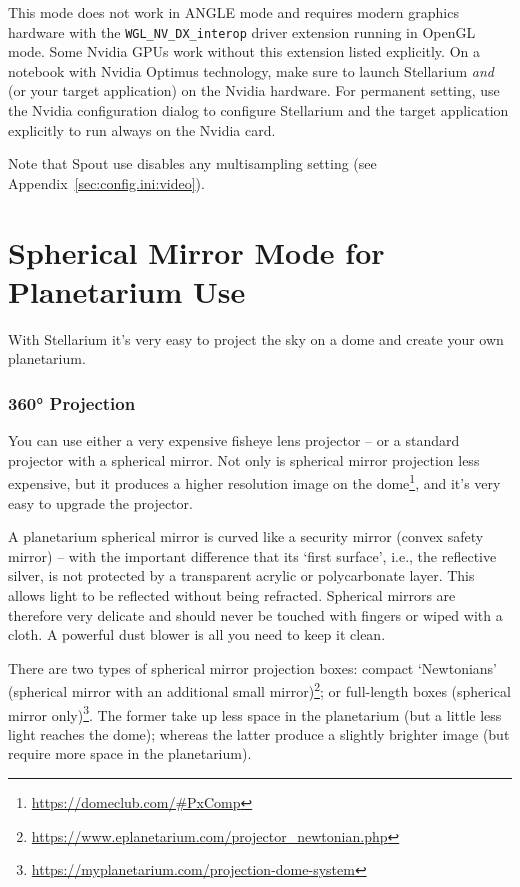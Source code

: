 This mode does not work in ANGLE mode and requires modern graphics hardware with the \texttt{WGL\_NV\_DX\_interop} 
driver extension running in OpenGL mode. Some Nvidia GPUs work without this extension listed explicitly. 
On a notebook with Nvidia Optimus technology, make sure to launch Stellarium \emph{and}  
(or your target application) on the Nvidia hardware. 
For permanent setting, use the Nvidia configuration dialog to configure Stellarium and the target application explicitly to run always on the Nvidia card.

Note that Spout use disables any multisampling setting (see Appendix~\ref{sec:config.ini:video}). 

\section{Spherical Mirror Mode for Planetarium Use}
\label{sec:CommandLineOptions:SphericalMirror}

With Stellarium it’s very easy to project the sky on a dome and create your own planetarium.

\subsubsection{360° Projection}
You can use either a very expensive fisheye lens projector -- or a standard projector with a spherical mirror.
Not only is spherical mirror projection less expensive, 
but it produces a higher resolution image on the dome\footnote{\url{https://domeclub.com/#PxComp}},
and it's very easy to upgrade the projector.

A planetarium spherical mirror is curved like a security mirror (convex safety mirror) -- with the important
difference that its `first surface', i.e., the reflective silver, is not protected by a transparent acrylic or
polycarbonate layer. This allows light to be reflected without being refracted. Spherical mirrors are therefore
very delicate and should never be touched with fingers or wiped with a cloth. A powerful dust blower is all
you need to keep it clean.

There are two types of spherical mirror projection boxes: compact `Newtonians' (spherical mirror with an
additional small mirror)\footnote{\url{https://www.eplanetarium.com/projector_newtonian.php}}; 
or full-length boxes (spherical mirror only)\footnote{\url{https://myplanetarium.com/projection-dome-system}}. 
The former take up less space in the planetarium (but a little less light reaches the dome); 
whereas the latter produce a slightly brighter image (but require more space in the planetarium).

